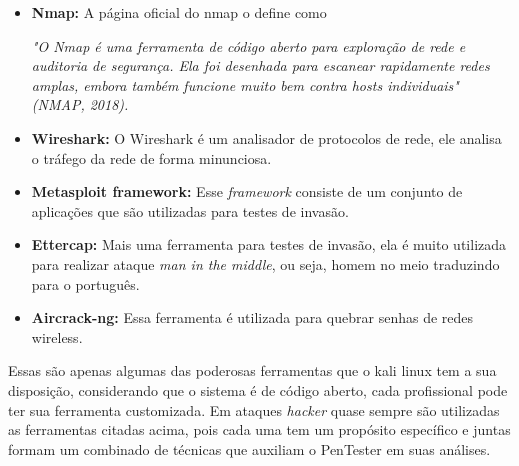 \begin{itemize}
\item \textbf{Nmap:} A página oficial do nmap o define como
\begin{flushright}
\small \it
	"O Nmap é uma ferramenta de código aberto para exploração de rede e auditoria de segurança. Ela foi desenhada para escanear rapidamente redes amplas, embora também funcione muito bem contra hosts individuais" (NMAP, 2018).\\
\end{flushright}

\item \textbf{Wireshark:} O Wireshark é um analisador de protocolos de rede, ele analisa o tráfego da rede de forma minunciosa.\\

\item \textbf{Metasploit framework:} Esse \textit{framework} consiste de um conjunto de aplicações que são utilizadas para testes de invasão.\\

\item \textbf{Ettercap:} Mais uma ferramenta para testes de invasão, ela é muito utilizada para realizar ataque \textit{man in the middle}, ou seja, homem no meio traduzindo para o português.

\item \textbf{Aircrack-ng:} Essa ferramenta é utilizada para quebrar senhas de redes wireless.
\end{itemize}

Essas são apenas algumas das poderosas ferramentas que o kali linux tem a sua disposição, considerando que o sistema é de código aberto, cada profissional pode ter sua ferramenta customizada. Em ataques \textit{hacker} quase sempre são utilizadas as ferramentas citadas acima, pois cada uma tem um propósito específico e juntas formam um combinado de técnicas que auxiliam o PenTester em suas análises.



